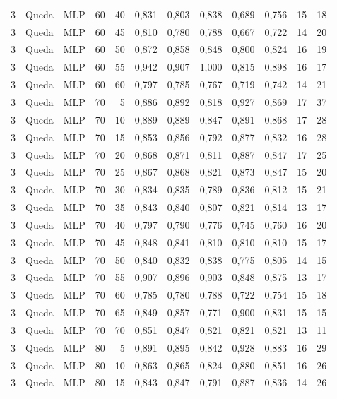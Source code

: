 \begin{longtable}{@{}rllrrrrrrrrr@{}}
3 & Queda & MLP & 60 & 40 & 0,831 & 0,803 & 0,838 & 0,689 & 0,756 & 15 & 18 \\
3 & Queda & MLP & 60 & 45 & 0,810 & 0,780 & 0,788 & 0,667 & 0,722 & 14 & 20 \\
3 & Queda & MLP & 60 & 50 & 0,872 & 0,858 & 0,848 & 0,800 & 0,824 & 16 & 19 \\
3 & Queda & MLP & 60 & 55 & 0,942 & 0,907 & 1,000 & 0,815 & 0,898 & 16 & 17 \\
3 & Queda & MLP & 60 & 60 & 0,797 & 0,785 & 0,767 & 0,719 & 0,742 & 14 & 21 \\
3 & Queda & MLP & 70 & 5 & 0,886 & 0,892 & 0,818 & 0,927 & 0,869 & 17 & 37 \\
3 & Queda & MLP & 70 & 10 & 0,889 & 0,889 & 0,847 & 0,891 & 0,868 & 17 & 28 \\
3 & Queda & MLP & 70 & 15 & 0,853 & 0,856 & 0,792 & 0,877 & 0,832 & 16 & 28 \\
3 & Queda & MLP & 70 & 20 & 0,868 & 0,871 & 0,811 & 0,887 & 0,847 & 17 & 25 \\
3 & Queda & MLP & 70 & 25 & 0,867 & 0,868 & 0,821 & 0,873 & 0,847 & 15 & 20 \\
3 & Queda & MLP & 70 & 30 & 0,834 & 0,835 & 0,789 & 0,836 & 0,812 & 15 & 21 \\
3 & Queda & MLP & 70 & 35 & 0,843 & 0,840 & 0,807 & 0,821 & 0,814 & 13 & 17 \\
3 & Queda & MLP & 70 & 40 & 0,797 & 0,790 & 0,776 & 0,745 & 0,760 & 16 & 20 \\
3 & Queda & MLP & 70 & 45 & 0,848 & 0,841 & 0,810 & 0,810 & 0,810 & 15 & 17 \\
3 & Queda & MLP & 70 & 50 & 0,840 & 0,832 & 0,838 & 0,775 & 0,805 & 14 & 15 \\
3 & Queda & MLP & 70 & 55 & 0,907 & 0,896 & 0,903 & 0,848 & 0,875 & 13 & 17 \\
3 & Queda & MLP & 70 & 60 & 0,785 & 0,780 & 0,788 & 0,722 & 0,754 & 15 & 18 \\
3 & Queda & MLP & 70 & 65 & 0,849 & 0,857 & 0,771 & 0,900 & 0,831 & 15 & 15 \\
3 & Queda & MLP & 70 & 70 & 0,851 & 0,847 & 0,821 & 0,821 & 0,821 & 13 & 11 \\
3 & Queda & MLP & 80 & 5 & 0,891 & 0,895 & 0,842 & 0,928 & 0,883 & 16 & 29 \\
3 & Queda & MLP & 80 & 10 & 0,863 & 0,865 & 0,824 & 0,880 & 0,851 & 16 & 26 \\
3 & Queda & MLP & 80 & 15 & 0,843 & 0,847 & 0,791 & 0,887 & 0,836 & 14 & 26 \\

\end{longtable}
